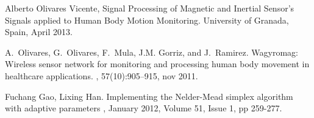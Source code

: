 \documentclass{IOS-Book-Article}
\begin{document}
\begin{thebibliography}{99}
Alberto Olivares Vicente,
\newblock Signal Processing of Magnetic and Inertial Sensor's Signals applied to Human Body Motion Monitoring. 
\newblock University of Granada, Spain, April 2013.

A.~Olivares, G.~Olivares, F.~Mula, {J.M.} Gorriz, and J.~Ramirez.
\newblock Wagyromag: Wireless sensor network for monitoring and processing
  human body movement in healthcare applications.
, 57(10):905--915, nov 2011.

Fuchang Gao, Lixing Han. 
\newblock Implementing the Nelder-Mead simplex algorithm with adaptive parameters
, January 2012, Volume 51, Issue 1, pp 259-277.

\end{thebibliography}
\end{document}
